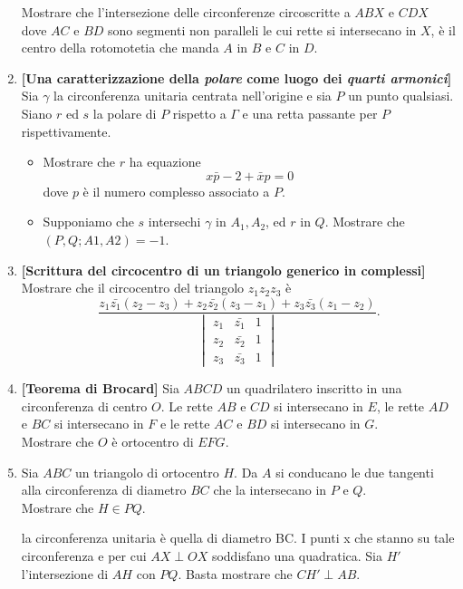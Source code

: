 \begin{enumerate}
	Mostrare che l'intersezione delle circonferenze circoscritte a $ABX$ e $CDX$ dove $AC$ e $BD$ sono segmenti non paralleli le cui rette si intersecano in $X$, è il centro della rotomotetia che manda $A$ in $B$ e $C$ in $D$. 
	\item \textbf{[Una caratterizzazione della \textit{polare} come luogo dei \emph{quarti armonici}]} Sia $\gamma$ la circonferenza unitaria centrata nell'origine e sia $P$ un punto qualsiasi. Siano $r$ ed $s$ la polare di $P$ rispetto a $\Gamma$ e una retta passante per $P$ rispettivamente. 
		\begin{itemize}
		\item Mostrare che $r$ ha equazione
			\begin{equation}
			x\bar{p}-2+\bar{x}p=0
			\end{equation}
			dove $p$ è il numero complesso associato a $P$.
		\item  Supponiamo che $s$ intersechi $\gamma$ in $A_1, A_2$, ed $r$ in $Q$. Mostrare che $(P,Q;A1,A2)=-1$.
		\end{itemize}
	\item \textbf{[Scrittura del circocentro di un triangolo generico in complessi]} Mostrare che il circocentro del triangolo $z_1z_2z_3$ è
		\begin{equation}
		\frac{z_1\bar{z_1}(z_2-z_3)+z_2\bar{z_2}(z_3-z_1)+z_3\bar{z_3}(z_1-z_2)}{\begin{vmatrix}
			z_1 & \bar{z_1} & 1 \\
			z_2 & \bar{z_2} & 1 \\
			z_3 & \bar{z_3} & 1 
			\end{vmatrix}}.
		\end{equation}
	\item \textbf{[Teorema di Brocard]} Sia $ABCD$ un quadrilatero inscritto in una circonferenza di centro $O$. Le rette $AB$ e $CD$ si intersecano in $E$, le rette $AD$ e $BC$ si intersecano in $F$ e le rette $AC$ e $BD$ si intersecano in $G$. \\
	Mostrare che $O$ è ortocentro di $EFG$.
	
	\item Sia $ABC$ un triangolo di ortocentro $H$. Da $A$ si conducano le due tangenti alla circonferenza di diametro $BC$ che la intersecano in $P$ e $Q$. \\
	Mostrare che $H\in PQ$.
	
	\begin{sol} la circonferenza unitaria è quella di diametro BC.
	I punti x che stanno su tale circonferenza e per cui $AX \perp OX$ soddisfano una quadratica. Sia $H'$ l'intersezione di $AH$ con $PQ$. Basta mostrare che $CH' \perp AB.$
	\end{sol}
	

\end{enumerate}
